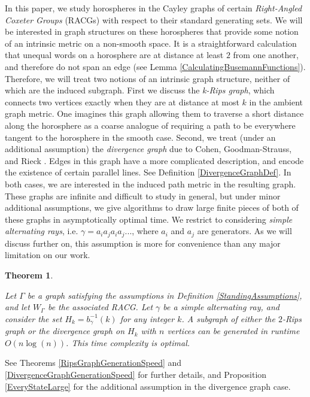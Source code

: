 \documentclass{amsart}
\newtheorem{theorem}{Theorem}[subsection]
\theoremstyle{definition}
\theoremstyle{remark}
\begin{document}
	In this paper, we study horospheres in the Cayley graphs of certain \textit{Right-Angled Coxeter Groups} (RACGs) with respect to their standard generating sets. We will be interested in graph structures on these horospheres that provide some notion of an intrinsic metric on a non-smooth space. It is a straightforward calculation that unequal words on a horosphere are at distance at least $2$ from one another, and therefore do not span an edge (see Lemma \ref{CalculatingBusemannFunctions}). Therefore, we will treat two notions of an intrinsic graph structure, neither of which are the induced subgraph. First we discuss the \textit{k-Rips graph}, which connects two vertices exactly when they are at distance at most $k$ in the ambient graph metric. One imagines this graph allowing them to traverse a short distance along the horosphere as a coarse analogue of requiring a path to be everywhere tangent to the horosphere in the smooth case. Second, we treat (under an additional assumption) the \textit{divergence graph} due to Cohen, Goodman-Strauss, and Rieck \cite{CGSR}. Edges in this graph have a more complicated description, and encode the existence of certain parallel lines. See Definition \ref{DivergenceGraphDef}. In both cases, we are interested in the induced path metric in the resulting graph. These graphs are infinite and difficult to study in general, but under minor additional assumptions, we give algorithms to draw large finite pieces of both of these graphs in asymptotically optimal time. We restrict to considering \textit{simple alternating rays}, i.e. $\gamma=a_ia_ja_ia_j ...$, where $a_i$ and $a_j$ are generators. As we will discuss further on, this assumption is more for convenience than any major limitation on our work.
	
	\begin{theorem} \label{IntroMainThm}
		
		Let $\Gamma$ be a graph satisfying the assumptions in Definition \ref{StandingAssumptions}, and let $W_\Gamma$ be the associated RACG. Let $\gamma$ be a simple alternating ray, and consider the set $H_k=b_\gamma^{-1}(k)$ for any integer $k$. A subgraph of either the $2$-Rips graph or the divergence graph on $H_k$ with $n$ vertices can be generated in runtime $O(n\log(n))$. This time complexity is optimal.
		
	\end{theorem}
	
	See Theorems \ref{RipsGraphGenerationSpeed} and \ref{DivergenceGraphGenerationSpeed} for further details, and Proposition \ref{EveryStateLarge} for the additional assumption in the divergence graph case.
	
\end{document}
